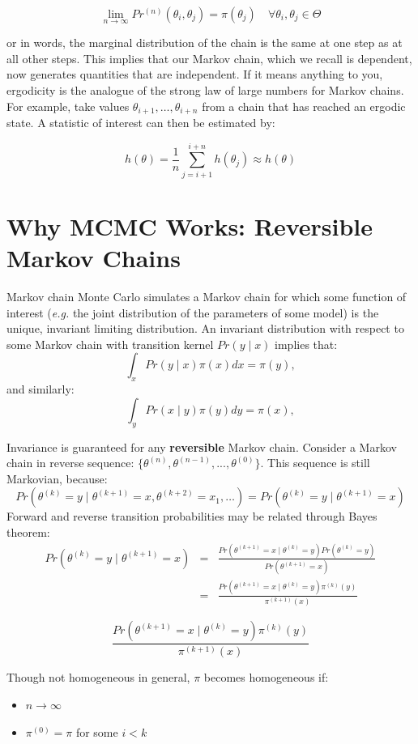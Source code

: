 \documentclass[]{book}
\begin{document}
\begin{itemize}
\[
\lim_{n \to \infty} Pr^{(n)}(\theta_i,\theta_j) = \pi(\theta_j) \quad \forall \theta_i, \theta_j \in \Theta
\]

\noindent or in words, the marginal distribution of the chain is the same at one step as at all other steps. This implies that our Markov chain, which we recall is dependent, now generates quantities that are independent. If it means anything to you, ergodicity is the analogue of the strong law of large numbers for Markov chains. For example, take values $\theta_{i+1},\ldots,\theta_{i+n}$ from a chain that has reached an ergodic state. A statistic of interest can then be estimated by:

\[
\hat{h}(\theta) = \frac{1}{n}\sum_{j=i+1}^{i+n} h(\theta_j) \approx h(\theta)
\]

\end{itemize}

\section{Why MCMC Works: Reversible Markov Chains}

Markov chain Monte Carlo simulates a Markov chain for which some function of interest (\emph{e.g.} the joint distribution of the parameters of some model) is the unique, invariant limiting distribution. An invariant distribution with respect to some Markov chain with transition kernel $Pr(y \mid x)$ implies that:
\[
\int_x Pr(y \mid x) \pi(x) dx = \pi(y),
\]
and similarly:
\[
\int_y Pr(x \mid y) \pi(y) dy = \pi(x),
\]

Invariance is guaranteed for any \textbf{reversible} Markov chain. Consider a Markov chain in reverse sequence: $\{\theta^{(n)},\theta^{(n-1)},...,\theta^{(0)}\}$. This sequence is still Markovian, because:
\[
Pr(\theta^{(k)}=y \mid \theta^{(k+1)}=x,\theta^{(k+2)}=x_1,\ldots ) = Pr(\theta^{(k)}=y \mid \theta^{(k+1)}=x)
\]
Forward and reverse transition probabilities may be related through Bayes theorem:
\begin{eqnarray}
Pr(\theta^{(k)}=y \mid \theta^{(k+1)}=x) &=& \frac{Pr(\theta^{(k+1)}=x \mid \theta^{(k)}=y) Pr(\theta^{(k)}=y)}{Pr(\theta^{(k+1)}=x)} \nonumber \\
&=& \frac{Pr(\theta^{(k+1)}=x \mid \theta^{(k)}=y) \pi^{(k)}(y)}{\pi^{(k+1)}(x)} \nonumber
\end{eqnarray}

\[
\frac{Pr(\theta^{(k+1)}=x \mid \theta^{(k)}=y) \pi^{(k)}(y)}{\pi^{(k+1)}(x)}
\]

\noindent Though not homogeneous in general, $\pi$ becomes homogeneous if:
\begin{itemize}
\item $n \rightarrow \infty$
\item $\pi^{(0)}=\pi$ for some $i < k$
\end{itemize}
\end{document}
